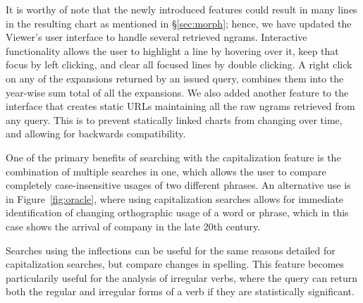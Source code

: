 \documentclass[11pt,a4paper]{article}
\begin{document}
It is worthy of note that the newly introduced features could result in many lines in the resulting chart as mentioned in \S\ref{sec:morph}; hence, we have updated the Viewer's user interface to handle several retrieved ngrams. Interactive functionality allows the user to highlight a line by hovering over it, keep that focus by left clicking, and clear all focused lines by double clicking. A right click on any of the expansions returned by an issued query, combines them into the year-wise sum total of all the expansions. We also added another feature to the interface that creates static URLs maintaining all the raw ngrams retrieved from any query. This is to prevent statically linked charts from changing over time, and allowing for backwards compatibility.

One of the primary benefits of searching with the capitalization feature is the combination of multiple searches in one, which allows the user to compare completely case-insensitive usages of two different phrases. An alternative use is in Figure~\ref{fig:oracle}, where using capitalization searches allows for immediate identification of changing orthographic usage of a word or phrase, which in this case shows the arrival of company in the late 20th century.

Searches using the inflections can be useful for the same reasons detailed for capitalization searches, but compare changes in spelling. This feature becomes particularily useful for the analysis of irregular verbs, where the query can return both the regular and irregular forms of a verb if they are statistically significant.
\end{document}
